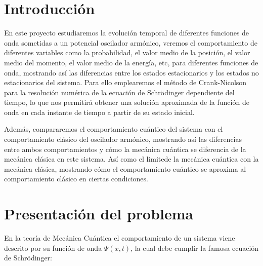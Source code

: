 \documentclass[10pt,onecolumn]{article}
\begin{document}
\tableofcontents %
\newpage

\HRule{0.5pt} %

\begin{abstract}
Estudio de la evolución temporal de varias funciones de ondas sometidas a un pozo armónico, empleando el método de Crank-Nicolson para la resolución numérica de ec. de Schrödinger dependiente del tiempo. Las funciones de onda estudiadas incluyen las autofunciones del sistema y una función gaussiana, mostrando así las diferencias entre los estados estacionarios y los estados no estacionarios del sistema. 
\end{abstract}

\section{Introducción}
En este proyecto estudiaremos la evolución temporal de diferentes funciones de onda sometidas a un potencial oscilador armónico, veremos el comportamiento de diferentes variables como la probabilidad, el valor medio de la posición, el valor medio del momento, el valor medio de la energía, etc,  para diferentes funciones de onda, mostrando así las diferencias entre los estados estacionarios y los estados no estacionarios del sistema. Para ello emplearemos el método de Crank-Nicolson para la resolución numérica de la ecuación de Schrödinger dependiente del tiempo, lo que nos permitirá obtener una solución aproximada de la función de onda en cada instante de tiempo a partir de su estado inicial.

Además, compararemos el comportamiento cuántico del sistema con el comportamiento clásico del oscilador armónico, mostrando así las diferencias entre ambos comportamientos y cómo la mecánica cuántica se diferencia de la mecánica clásica en este sistema. Así como el limitede la mecánica cuántica con la mecánica clásica, mostrando cómo el comportamiento cuántico se aproxima al comportamiento clásico en ciertas condiciones.





\section{Presentación del problema}
En la teoría de Mecánica Cuántica el comportamiento de un sistema viene descrito por su función de onda $\Psi(x,t)$, la cual debe cumplir la famosa ecuación de Schrödinger:
\end{document}
